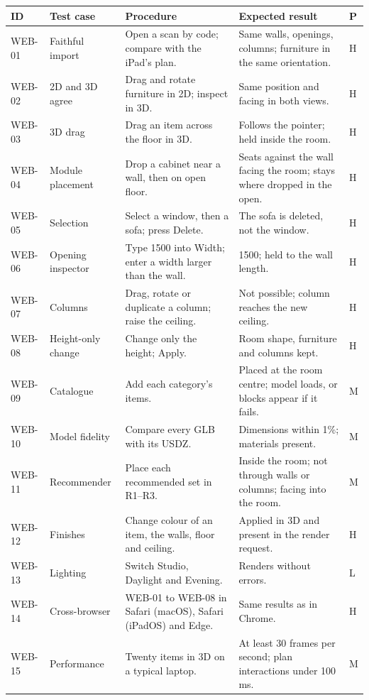 \documentclass[conference,a4paper,10pt]{IEEEtran}
\begin{document}
\begin{longtable}{@{}L{1.25cm}L{3.6cm}L{5.4cm}L{5.1cm}C{0.4cm}@{}}
\toprule
ID & Test case & Procedure & Expected result & P \\
\midrule
\endhead
\bottomrule
\endfoot
WEB-01 & Faithful import & Open a scan by code; compare with the iPad's plan. & Same walls, openings, columns; furniture in the same orientation. & H \\
WEB-02 & 2D and 3D agree & Drag and rotate furniture in 2D; inspect in 3D. & Same position and facing in both views. & H \\
WEB-03 & 3D drag & Drag an item across the floor in 3D. & Follows the pointer; held inside the room. & H \\
WEB-04 & Module placement & Drop a cabinet near a wall, then on open floor. & Seats against the wall facing the room; stays where dropped in the open. & H \\
WEB-05 & Selection & Select a window, then a sofa; press Delete. & The sofa is deleted, not the window. & H \\
WEB-06 & Opening inspector & Type 1500 into Width; enter a width larger than the wall. & 1500; held to the wall length. & H \\
WEB-07 & Columns & Drag, rotate or duplicate a column; raise the ceiling. & Not possible; column reaches the new ceiling. & H \\
WEB-08 & Height-only change & Change only the height; Apply. & Room shape, furniture and columns kept. & H \\
WEB-09 & Catalogue & Add each category's items. & Placed at the room centre; model loads, or blocks appear if it fails. & M \\
WEB-10 & Model fidelity & Compare every GLB with its USDZ. & Dimensions within 1\%; materials present. & M \\
WEB-11 & Recommender & Place each recommended set in R1--R3. & Inside the room; not through walls or columns; facing into the room. & M \\
WEB-12 & Finishes & Change colour of an item, the walls, floor and ceiling. & Applied in 3D and present in the render request. & H \\
WEB-13 & Lighting & Switch Studio, Daylight and Evening. & Renders without errors. & L \\
WEB-14 & Cross-browser & WEB-01 to WEB-08 in Safari (macOS), Safari (iPadOS) and Edge. & Same results as in Chrome. & H \\
WEB-15 & Performance & Twenty items in 3D on a typical laptop. & At least 30 frames per second; plan interactions under 100\,ms. & M \\

\end{longtable}
\end{document}
